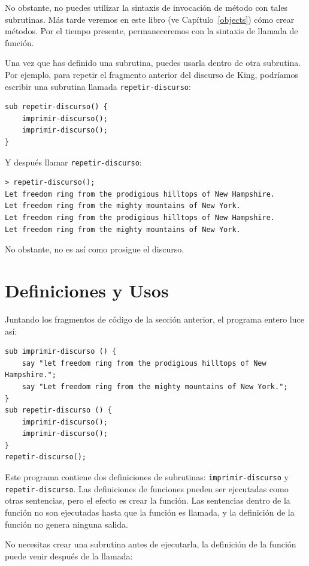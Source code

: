 No obstante, no puedes utilizar la sintaxis de invocación de método
con tales subrutinas. Más tarde veremos en este libro (ve
Capítulo~\ref{objects}) cómo crear métodos. Por el tiempo presente,
permaneceremos con la sintaxis de llamada de función.

Una vez que has definido una subrutina, puedes usarla dentro
de otra subrutina. Por ejemplo, para repetir el fragmento anterior
del discurso de King, podríamos escribir una subrutina llamada 
\verb|repetir-discurso|:

\begin{lstlisting}
sub repetir-discurso() {
    imprimir-discurso();
    imprimir-discurso();
}
\end{lstlisting}
%
Y después llamar \verb|repetir-discurso|:

\begin{lstlisting}
> repetir-discurso();
Let freedom ring from the prodigious hilltops of New Hampshire.
Let freedom ring from the mighty mountains of New York.
Let freedom ring from the prodigious hilltops of New Hampshire.
Let freedom ring from the mighty mountains of New York.
\end{lstlisting}
%
No obstante, no es así como prosigue el discurso.


\section{Definiciones y Usos}

Juntando los fragmentos de código de la sección anterior, el
programa entero luce así:

\begin{lstlisting}
sub imprimir-discurso () {
    say "let freedom ring from the prodigious hilltops of New Hampshire.";
    say "Let freedom ring from the mighty mountains of New York.";
}
sub repetir-discurso () {
    imprimir-discurso();
    imprimir-discurso();
}
repetir-discurso();
\end{lstlisting}
%
Este programa contiene dos definiciones de subrutinas: \verb|imprimir-discurso|
y \verb|repetir-discurso|. Las definiciones de funciones pueden ser ejecutadas
como otras sentencias, pero el efecto es crear la función. Las sentencias
dentro de la función no son ejecutadas hasta que la función es llamada, y
la definición de la función no genera ninguna salida.

No necesitas crear una subrutina antes de ejecutarla,
la definición de la función puede venir después de la llamada:

